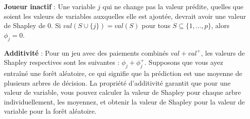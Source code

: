 \textbf{Joueur inactif} : Une variable \( j \) qui ne change pas la valeur prédite, quelles que soient les valeurs de variables auxquelles elle est ajoutée, devrait avoir une valeur de Shapley de 0.
Si \( val(S\cup\{j\})=val(S) \) pour tous \( S\subseteq\{1,\ldots,p\} \), alors \( \phi_j=0 \).

\textbf{Additivité} : Pour un jeu avec des paiements combinés \( val+val^{+} \), les valeurs de Shapley respectives sont les suivantes : \( \phi_j+\phi_j^{+} \). 
Supposons que vous ayez entraîné une forêt aléatoire, ce qui signifie que la prédiction est une moyenne de plusieurs arbres de décision. La propriété d'additivité garantit que pour une valeur de variable, vous pouvez calculer la valeur de Shapley pour chaque arbre individuellement, les moyennez, et obtenir la valeur de Shapley pour la valeur de variable pour la forêt aléatoire.

